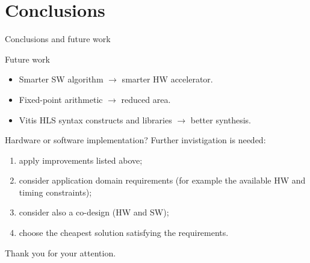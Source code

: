 \documentclass[xcolor=table]{beamer}
\begin{document}
\section{Conclusions}

\begin{frame}{Conclusions and future work}
  \begin{block}{Future work}
    \begin{itemize}
      \item Smarter SW algorithm $\longrightarrow$ smarter HW accelerator.
      \item Fixed-point arithmetic $\longrightarrow$ reduced area.
      \item Vitis HLS syntax constructs and libraries $\longrightarrow$ better synthesis.
    \end{itemize}
  \end{block}

  \begin{block}{Hardware or software implementation?}
    Further invistigation is needed:
    \begin{enumerate}
      \item
      apply improvements listed above;
      \item
      consider application domain requirements (for example the available HW and timing constraints);
      \item
      consider also a co-design (HW and SW);
      \item
      choose the cheapest solution satisfying the requirements.
    \end{enumerate}
  \end{block}
\end{frame}

\begin{frame}[plain]
  \centering
  \huge Thank you for your attention.
\end{frame}
\end{document}
